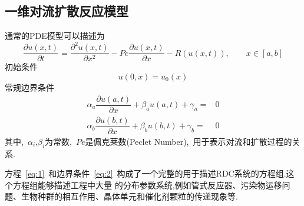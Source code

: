 \documentclass[a4paper,cs4size,adobefonts,cm-default,no-math]{ctexart}
\begin{document}
\subsection{一维对流扩散反应模型}
通常的PDE模型可以描述为
\begin{equation}\label{eq:1}
 \dfrac{\partial u(x,t)}{\partial t}=\dfrac{\partial^2 u(x,t)}{\partial x^2}-Pe\dfrac{\partial u(x,t)}{\partial x}
 -R(u(x,t)),\qquad x\in[a,b] 
\end{equation}
初始条件
\begin{equation}\label{eq:2}
 u(0,x)=u_0(x)
\end{equation}
常规边界条件
\begin{equation}\label{eq:3}
\begin{aligned}
 \alpha_a\dfrac{\partial u(a,t)}{\partial x}+\beta_a u(a,t)+\gamma_a=&0 \\
 \alpha_b\dfrac{\partial u(b,t)}{\partial x}+\beta_b u(b,t)+\gamma_b=&0
\end{aligned}
\end{equation}
其中,~$\alpha_i$,$\beta_i$为常数,~$Pe$是佩克莱数(Peclet Number),~用于表示对流和扩散过程的关系.\par
方程~\ref{eq:1}~和边界条件~\ref{eq:2}~构成了一个完整的用于描述RDC系统的方程组.这个方程组能够描述工程中大量
的分布参数系统,例如管式反应器、污染物运移问题、生物种群的相互作用、晶体单元和催化剂颗粒的传递现象等.
\end{document}
